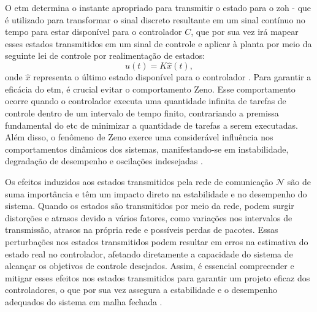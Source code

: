 O \acrshort{etm} determina o instante apropriado para transmitir o estado para o \acrfull{zoh} - que é utilizado para transformar o sinal discreto resultante em um sinal contínuo no tempo para estar disponível para o controlador $C$, que por sua vez irá mapear esses estados transmitidos em um sinal de controle e aplicar à planta por meio da seguinte lei de controle por realimentação de estados: \begin{equation}u(t) = K \hat{x}(t),\end{equation} onde $\hat{x}$ representa o último estado disponível para o controlador \citep{coutinho2021}. Para garantir a eficácia do \acrshort{etm}, é crucial evitar o comportamento Zeno. Esse comportamento ocorre quando o controlador executa uma quantidade infinita de tarefas de controle dentro de um intervalo de tempo finito, contrariando a premissa fundamental do \acrshort{etc} de minimizar a quantidade de tarefas a serem executadas. Além disso, o fenômeno de Zeno exerce uma considerável influência nos comportamentos dinâmicos dos sistemas, manifestando-se em instabilidade, degradação de desempenho e oscilações indesejadas \citep{Yang2024}.

Os efeitos induzidos aos estados transmitidos pela rede de comunicação $\mathcal{N}$ são de suma importância e têm um impacto direto na estabilidade e no desempenho do sistema. Quando os estados são transmitidos por meio da rede, podem surgir distorções e atrasos devido a vários fatores, como variações nos intervalos de transmissão, atrasos na própria rede e possíveis perdas de pacotes. Essas perturbações nos estados transmitidos podem resultar em erros na estimativa do estado real no controlador, afetando diretamente a capacidade do sistema de alcançar os objetivos de controle desejados. Assim, é essencial compreender e mitigar esses efeitos nos estados transmitidos para garantir um projeto eficaz dos controladores, o que por sua vez assegura a estabilidade e o desempenho adequados do sistema em malha fechada \citep{coutinho2021}.


